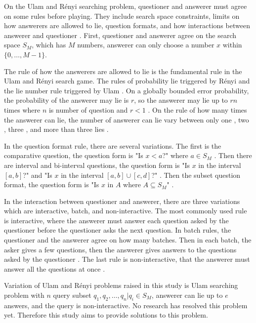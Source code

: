 \documentclass{TTP_DSL2006}
\begin{document}
On the Ulam and Rényi searching problem, questioner and answerer must agree on some rules before playing. They include search space constraints, limits on how answerers are allowed to lie, question formats, and how interactions between answerer and questioner \cite{Pelc2002}. First, questioner and answerer agree on the search space $S_M$, which has $M$ numbers, answerer can only choose a number $x$ within $\{0,\ldots,M-1\}$.

The rule of how the answerers are allowed to lie is the fundamental rule in the Ulam and Rényi search game. The rules of probability lie triggered by Rényi and the lie number rule triggered by Ulam \cite{StanislawMUlam1976}. On a globally bounded error probability, the probability of the answerer may lie is $r$, so the answerer may lie up to $rn$ times where $n$ is number of question and $r<1$ \cite{Dhagat1999}. On the rule of how many times the answerer can lie, the number of answerer can lie vary between only one \cite{Ellis2008} \cite{Pelc1988}, two \cite{Cicalese2000}, three \cite{Negro1992}, and more than three lies \cite{Berlekamp1998} \cite{Deppe2004}.

In the question format rule, there are several variations. The first is the comparative question, the question form is "Is $x<a$?" where $a \in S_M$ \cite{Innes} \cite{Auletta1992}. Then there are interval and bi-interval questions, the question form is "Is $x$ in the interval $[a, b]$?" \cite{Peter2017} and "Is $x$ in the interval $[a, b] \cup [c, d]$?" \cite{Mundici1997}. Then the subset question format, the question form is "Is $x$ in $A$ where $A \subseteq S_M$" \cite{Katona} \cite{Macula1997}.

In the interaction between questioner and answerer, there are three variations which are interactive, batch, and non-interactive. The most commonly used rule is interactive, where the answerer must answer each question asked by the questioner before the questioner asks the next question. In batch rules, the questioner and the answerer agree on how many batches. Then in each batch, the asker gives a few questions, then the answerer gives answers to the questions asked by the questioner \cite{Cicalese2000}. The last rule is non-interactive, that the answerer must answer all the questions at once \cite{Macula1997}.

Variation of Ulam and Rényi problems raised in this study is Ulam searching problem with $n$ query subset ${q_1,q_2,\ldots,q_n} | q_i \in S_M$, answerer can lie up to $e$ answers, and the query is non-interactive. No research has resolved this problem yet. Therefore this study aims to provide solutions to this problem.
\end{document}

